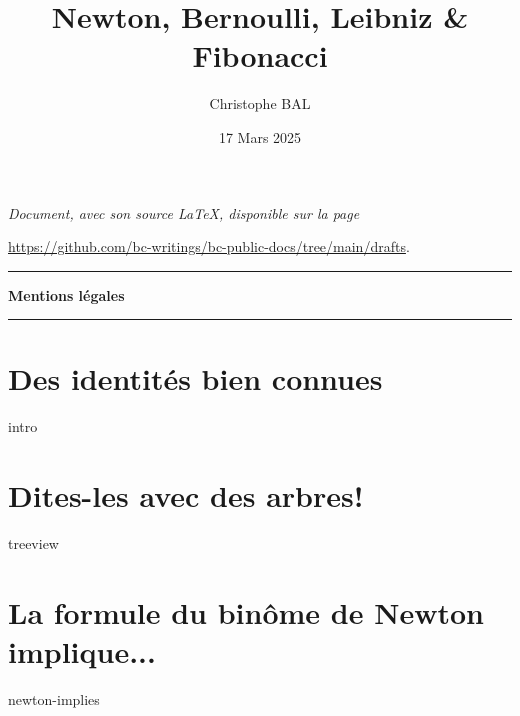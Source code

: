 \documentclass[12pt]{amsart}
\begin{document}
\title{Newton, Bernoulli, Leibniz \& Fibonacci}
\author{Christophe BAL}
\date{17 Mars 2025}

\maketitle

\begin{center}
	\itshape
	Document, avec son source \LaTeX, disponible sur la page

	\url{https://github.com/bc-writings/bc-public-docs/tree/main/drafts}.
\end{center}


\bigskip


\begin{center}
	\hrule\vspace{.3em}
	{
		\fontsize{1.35em}{1em}\selectfont
		\textbf{Mentions \og légales \fg}
	}

	\vspace{0.45em}
	\doclicenseThis
	\hrule
\end{center}


\bigskip


\setcounter{tocdepth}{1}
\tableofcontents



\newpage

\section{Des identités bien connues}

{intro}


\section{Dites-les avec des arbres!}

{treeview}



\section{La formule du binôme de Newton implique...}

{newton-implies}
\end{document}
